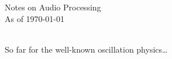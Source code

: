 \documentclass{article}
\begin{document}

\begin{center}
{\Large Notes on Audio Processing} \\
{\large As of \today} \\
\end{center}


\\So far for the well-known oscillation physics\dots

\newpage

\end{document}
